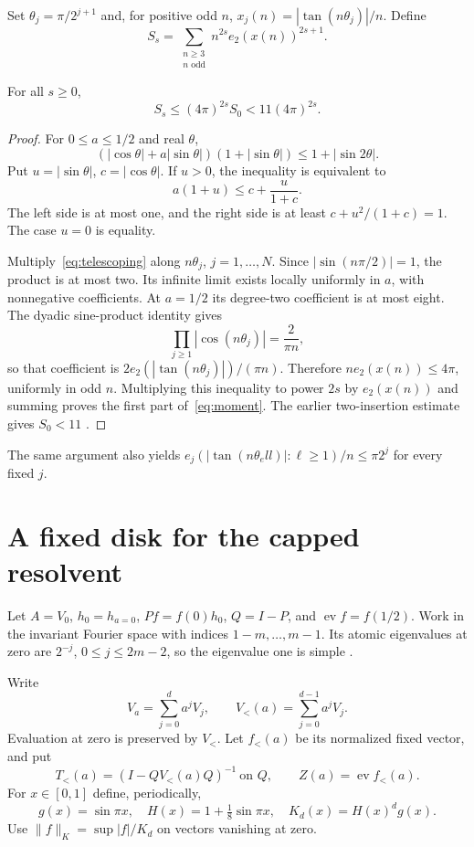 \documentclass[11pt,a4paper]{article}
\theoremstyle{remark}\newtheorem*{ednote}{Editorial note (ProveIt, 2026-10-01)}
\newcommand{\ev}{\operatorname{ev}}\newcommand{\Z}{\mathbb Z}
\begin{document}
Set $\theta_j=\pi/2^{j+1}$ and, for positive odd $n$, $x_j(n)=|\tan(n\theta_j)|/n$. Define
\[
S_s=\sum_{\substack{n\ge3\\n\text{ odd}}}n^{2s}e_2(x(n))^{2s+1}.
\]
\begin{lemma}\label{lem:moment}
For all $s\ge0$,
\begin{equation}\label{eq:moment}
S_s\le(4\pi)^{2s}S_0<11(4\pi)^{2s}.
\end{equation}
\end{lemma}
\begin{proof}
For $0\le a\le1/2$ and real $\theta$,
\begin{equation}\label{eq:telescoping}
(|\cos\theta|+a|\sin\theta|)(1+|\sin\theta|)\le1+|\sin2\theta|.
\end{equation}
Put $u=|\sin\theta|$, $c=|\cos\theta|$. If $u>0$, the inequality is equivalent to
\[
a(1+u)\le c+\frac{u}{1+c}.
\]
The left side is at most one, and the right side is at least $c+u^2/(1+c)=1$. The case $u=0$ is equality.

Multiply~\eqref{eq:telescoping} along $n\theta_j$, $j=1,\ldots,N$. Since $|\sin(n\pi/2)|=1$, the product is at most two. Its infinite limit exists locally uniformly in $a$, with nonnegative coefficients. At $a=1/2$ its degree-two coefficient is at most eight. The dyadic sine-product identity gives
\[
\prod_{j\ge1}|\cos(n\theta_j)|=\frac2{\pi n},
\]
so that coefficient is $2e_2(|\tan(n\theta_j)|)/(\pi n)$. Therefore $n e_2(x(n))\le4\pi$, uniformly in odd $n$. Multiplying this inequality to power $2s$ by $e_2(x(n))$ and summing proves the first part of~\eqref{eq:moment}. The earlier two-insertion estimate gives $S_0<11$ \cite{boundary}.
\end{proof}
The same argument also yields $e_j(|\tan(n\theta_ell)|:\ell\ge1)/n\le\pi2^j$ for every fixed $j$.

\section{A fixed disk for the capped resolvent}
Let $A=V_0$, $h_0=h_{a=0}$, $Pf=f(0)h_0$, $Q=I-P$, and $\ev f=f(1/2)$. Work in the invariant Fourier space with indices $1-m,\ldots,m-1$. Its atomic eigenvalues at zero are $2^{-j}$, $0\le j\le2m-2$, so the eigenvalue one is simple \cite{integer,triangle}.

Write
\[
V_a=\sum_{j=0}^d a^jV_j,\qquad V_{<}(a)=\sum_{j=0}^{d-1}a^jV_j.
\]
Evaluation at zero is preserved by $V_{<}$. Let $f_{<}(a)$ be its normalized fixed vector, and put
\[
T_{<}(a)=(I-QV_{<}(a)Q)^{-1}\ \text{on }Q,\qquad Z(a)=\ev f_{<}(a).
\]
For $x\in[0,1]$ define, periodically,
\[
g(x)=\sin\pi x,\quad H(x)=1+\tfrac18\sin\pi x,\quad K_d(x)=H(x)^dg(x).
\]
Use $\|f\|_K=\sup|f|/K_d$ on vectors vanishing at zero.
\end{document}
